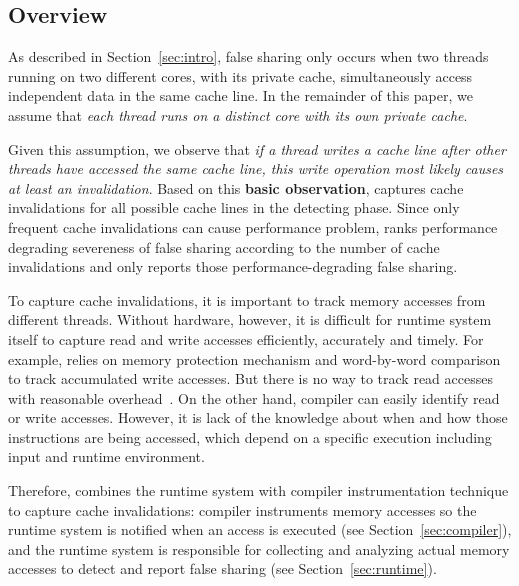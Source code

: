 \label{sec:detection}

\subsection{Overview}
\label{sec:overview}
As described in Section~\ref{sec:intro}, 
false sharing only occurs when two threads running on two different cores, with its private cache,
simultaneously access independent data in the same cache line.
In the remainder of this paper, we assume that {\it each thread runs on a 
distinct core with its own private cache}. 

Given this assumption, we observe that 
{\it if a thread writes a cache line after other threads have 
accessed the same cache line, this write operation most likely causes at least
an invalidation}. 
Based on this \textbf{basic observation}, \Predator{} captures cache invalidations for all possible 
cache lines 
in the detecting phase. Since only frequent cache invalidations can cause performance problem, 
\Predator{} ranks performance degrading severeness of false sharing according to 
the number of cache invalidations and only reports those performance-degrading false sharing.
 
To capture cache invalidations, it is important to track memory accesses from different 
threads. 
Without hardware, however, it is difficult for runtime system itself to 
capture read and write accesses efficiently, accurately and timely. 
For example, \Sheriff{} relies on memory protection mechanism and word-by-word
comparison to track accumulated write accesses. But there is no way to track read accesses with  
reasonable overhead~\cite{sheriff}. 
On the other hand, compiler can easily identify  
read or write accesses. However,
it is lack of the knowledge about when and how those instructions are being accessed, 
which depend on a specific execution including input and runtime environment. 

Therefore, \Predator{} combines the runtime system with compiler instrumentation technique to capture 
cache invalidations: compiler instruments memory accesses so the runtime
system is notified when an access is executed (see Section~\ref{sec:compiler}),
and the runtime system is responsible for collecting and analyzing actual memory accesses 
to detect and report false sharing (see Section~\ref{sec:runtime}).


